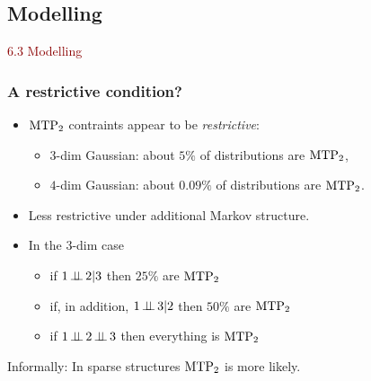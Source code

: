 \documentclass[dvipsnames,aspectratio=169]{beamer} %
\newcommand{\indep}{\mbox{\,$\perp\!\!\!\perp$\,}}
\newcommand{\mtp}{{\rm MTP}_{2}}
\begin{document}


\subsection{Modelling}
\begin{frame}{}
\begin{center}
	{\huge \textcolor{DarkRed}{6.3 Modelling}}
\end{center}
\end{frame}


\begin{frame}
\frametitle{A restrictive condition?}
\begin{itemize}
\item $\mtp$ contraints appear to be \textit{restrictive}:
\begin{itemize}
\item  $3$-dim Gaussian: about $5\%$ of distributions are $\mtp$,
\item  $4$-dim Gaussian: about $0{.}09\%$ of distributions are $\mtp$.\\[.4cm]
\end{itemize}
\item Less restrictive under additional Markov structure.\\[.4cm]
\item In the $3$-dim case
\begin{itemize}
\item if $1\indep 2|3$  then $25\%$ are $\mtp$
\item if, in addition, $1\indep 3|2$ then $50\%$ are $\mtp$
\item if $1\indep 2\indep 3$  then everything is $\mtp$\\[.4cm]
\end{itemize}
\end{itemize}
Informally: In sparse structures $\mtp$ is more likely.\\[.1cm]
\end{frame}
\end{document}
